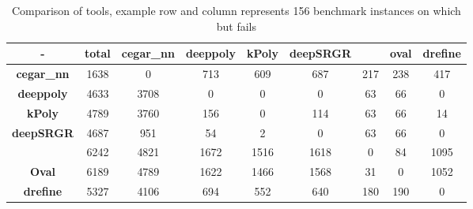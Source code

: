 \begin{table}
    \centering
    \begin{tabular}{|c|c|c|c|c|c|c|c|c|}
        \hline
        - & \textbf{total} & \textbf{cegar\_nn} & \textbf{deeppoly} & \textbf{kPoly} & \textbf{deepSRGR} & \alphabeta{} & \textbf{oval} & \textbf{drefine} \\
        \hline
        \textbf{cegar\_nn} & 1638 & 0 & 713 & 609 & 687 & 217 & 238 & 417 \\ 
        \hline
        \textbf{deeppoly} & 4633 & 3708 & 0 & 0 & 0 & 63 & 66 & 0  \\ 
        \hline
        \textbf{kPoly} & 4789 & 3760 & 156 & 0 & 114 & 63 & 66 & 14  \\ 
        \hline
        \textbf{deepSRGR} & 4687 & 951 & 54 & 2 & 0 & 63 & 66 & 0 \\ 
        \hline
        \alphabeta{} & 6242 & 4821 & 1672 & 1516 & 1618 & 0 & 84 & 1095  \\
        \hline
        \textbf{Oval} & 6189 & 4789 & 1622 & 1466 & 1568 & 31 & 0 & 1052 \\
        \hline
        \textbf{drefine} & 5327 & 4106 & 694 & 552 & 640 & 180 & 190 & 0  \\
        \hline
    \end{tabular}
    \caption{Comparison of tools, example row \kpoly{} and column \deeppoly{} represents 156 benchmark instances on which \kpoly{} but \deeppoly{} fails}
    \label{tb:matrix}
\end{table}